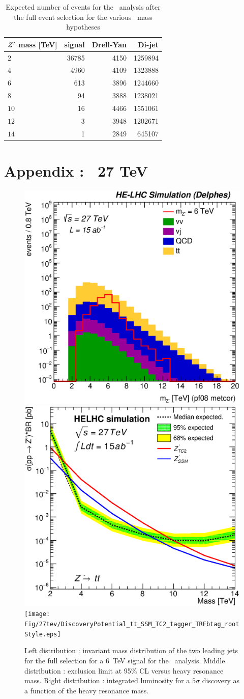 \begin{table}[!htb]
   \centering
\begin{tabular}{|l|r|r|r|}
  \hline
  \hline
$Z^{\prime}$ mass [TeV]  & signal &  Drell-Yan & Di-jet \\
  \hline
  $2$  & 36785 & 4150 & 1259894 \\
  $4$  &  4960 & 4109 & 1323888 \\
  $6$  &   613 & 3896 & 1244660 \\
  $8$  &    94 & 3888 & 1238021 \\
  $10$ &    16 & 4466 & 1551061 \\
  $12$ &     3 & 3948 & 1202671 \\
  $14$ &     1 & 2849 &  645107 \\
  \hline
  \hline
\end{tabular}
  \caption{Expected number of events for the \Zptata\ analysis after the full event selection for the various \Zp\ mass hypotheses}
  \label{tab:leptonicresonances27:yieldstautau}
\end{table}

\clearpage
\newpage

\section{Appendix :  \texorpdfstring{\Zptt}{zptt}\ 27 TeV}
\label{appendix:zptt27}

\begin{figure}[!htb]
  \centering
  \includegraphics[width=0.30\columnwidth]{Fig/27tev/Zptt_Mj1j2_pf08_MetCorr_fit_sel8_nostack_log.eps}
  \includegraphics[width=0.30\columnwidth]{Fig/27tev/lim_Zprime_tt_helhc_v01.eps}
  \texttt{[image: Fig/27tev/DiscoveryPotential\_tt\_SSM\_TC2\_tagger\_TRFbtag\_rootStyle.eps]}
  \caption{Left distribution : invariant mass distribution of the two leading jets for the full selection for a 6~TeV signal for the \Zptt\ analysis. Middle distribution : exclusion limit at 95\% CL versus heavy resonance mass. Right distribution : integrated luminosity for a $5\sigma$ discovery as a function of the heavy resonance mass.}
  \label{figure:hadronicresonances27:ttsel08}
\end{figure}

